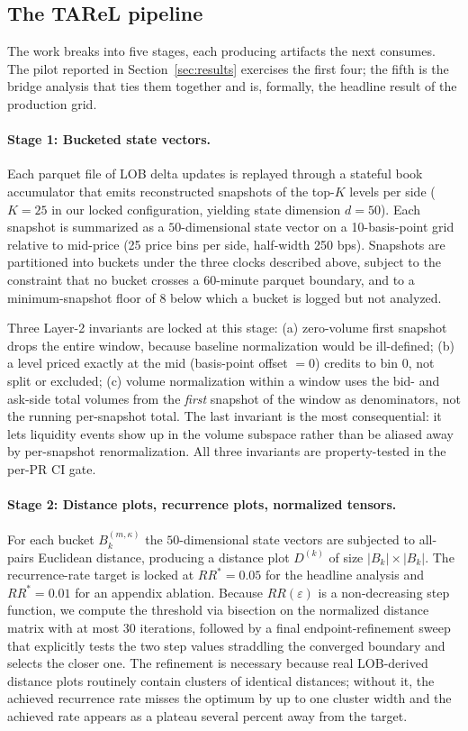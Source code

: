 \subsection*{The TAReL pipeline}
The work breaks into five stages, each producing artifacts the next
consumes. The pilot reported in
Section~\ref{sec:results} exercises the first four; the
fifth is the bridge analysis that ties them together and is,
formally, the headline result of the production grid.

\paragraph{Stage 1: Bucketed state vectors.}
Each parquet file of LOB delta updates is replayed through a stateful
book accumulator that emits reconstructed snapshots of the top-$K$
levels per side ($K=25$ in our locked configuration, yielding state
dimension $d = 50$). Each snapshot is summarized as a $50$-dimensional
state vector on a 10-basis-point grid relative to mid-price (25 price
bins per side, half-width 250 bps). Snapshots are partitioned into
buckets under the three clocks described above, subject to the
constraint that no bucket crosses a 60-minute parquet boundary, and to
a minimum-snapshot floor of $8$ below which a bucket is logged but
not analyzed.

Three Layer-2 invariants are locked at this stage: (a) zero-volume
first snapshot drops the entire window, because baseline normalization
would be ill-defined; (b) a level priced exactly at the mid
(basis-point offset $= 0$) credits to bin $0$, not split or excluded;
(c) volume normalization within a window uses the bid- and ask-side
total volumes from the \emph{first} snapshot of the window as
denominators, not the running per-snapshot total. The last invariant
is the most consequential: it lets liquidity events show up in the
volume subspace rather than be aliased away by per-snapshot
renormalization. All three invariants are property-tested in the
per-PR CI gate.

\paragraph{Stage 2: Distance plots, recurrence plots, normalized
tensors.}
For each bucket $B^{(m,\kappa)}_k$ the $50$-dimensional state vectors
are subjected to all-pairs Euclidean distance, producing a distance
plot $D^{(k)}$ of size $|B_k| \times |B_k|$. The recurrence-rate
target is locked at $RR^{*} = 0.05$ for the headline analysis and
$RR^{*} = 0.01$ for an appendix ablation. Because $RR(\varepsilon)$ is
a non-decreasing step function, we compute the threshold via
bisection on the normalized distance matrix with at most 30
iterations, followed by a final endpoint-refinement sweep that
explicitly tests the two step values straddling the converged
boundary and selects the closer one. The refinement is necessary
because real LOB-derived distance plots routinely contain clusters of
identical distances; without it, the achieved recurrence rate misses
the optimum by up to one cluster width and the achieved rate appears
as a plateau several percent away from the target.

